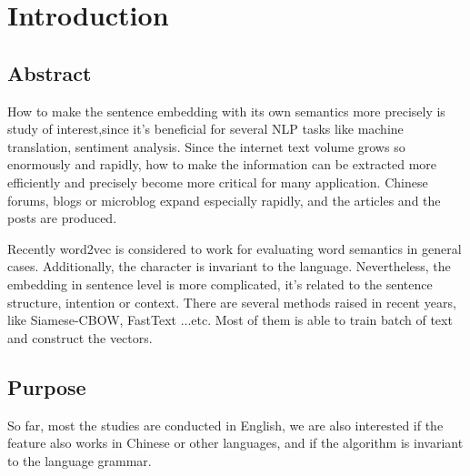 \chapter{Introduction}
\setlength{\baselineskip}{1.5em}
\setlength{\parindent}{2em}
\setlength{\parskip}{1em}

\section{Abstract}

How to make the sentence embedding with its own semantics more precisely is study of interest,since it's beneficial for several NLP tasks like machine translation, sentiment analysis. Since the internet text volume grows so enormously and rapidly, how to make the information can be extracted more efficiently and precisely become more critical for many application. Chinese forums, blogs or microblog expand especially rapidly, and the articles and the posts are produced.

Recently word2vec\cite{word2vec} is considered to work for evaluating word semantics in general cases.  Additionally, the character is invariant to the language. Nevertheless, the embedding in sentence level is more complicated, it's related to the sentence structure,  intention or context. There are several methods raised in recent years, like Siamese-CBOW, FastText ...etc. Most of them is able to train batch of text and construct the vectors.

\section{Purpose}

So far, most the studies are conducted in English, we are also interested if the feature also works in Chinese or other languages, and if the algorithm is invariant to the language grammar. 